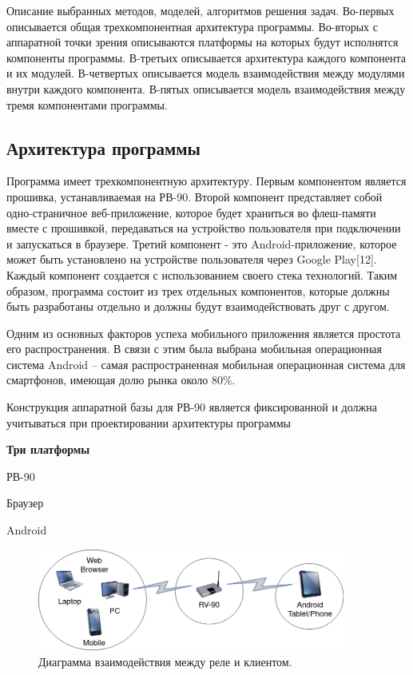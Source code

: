 Описание выбранных методов, моделей, алгоритмов решения задач.
Во-первых описывается общая трехкомпонентная архитектура программы.
Во-вторых с аппаратной точки зрения описываются платформы на которых будут исполнятся компоненты программы.
В-третьих описывается архитектура каждого компонента и их модулей.
В-четвертых описывается модель взаимодействия между модулями внутри каждого компонента.
В-пятых описывается модель взаимодействия между тремя компонентами программы.

\subsection{ Архитектура программы }
Программа имеет трехкомпонентную архитектуру. Первым компонентом является прошивка, устанавливаемая на РВ-90. Второй компонент представляет собой одно-страничное веб-приложение, которое будет храниться во флеш-памяти вместе с прошивкой, передаваться на устройство пользователя при подключении и запускаться в браузере. Третий компонент - это Android-приложение, которое может быть установлено на устройстве пользователя через Google Play[12]. Каждый компонент создается с использованием своего стека технологий. Таким образом, программа состоит из трех отдельных компонентов, которые должны быть разработаны отдельно и должны будут взаимодействовать друг с другом. 

Одним из основных факторов успеха мобильного приложения является простота его  распространения.  В связи с этим была выбрана мобильная операционная система  Android – самая распространенная мобильная операционная система для смартфонов, имеющая долю рынка около 80\%.
 
 
 
Конструкция аппаратной базы для РВ-90 является фиксированной и должна учитываться при проектировании архитектуры программы

\textbf{Три платформы}
\begin{my_itemize}
\item РВ-90
\item Браузер
\item Android
\end{my_itemize}


\begin{figure}[h!]
    \centering
    \includegraphics[width=0.9\textwidth]{three_platforms.png}
    \caption{Диаграмма взаимодействия между реле и клиентом.}
\end{figure}



